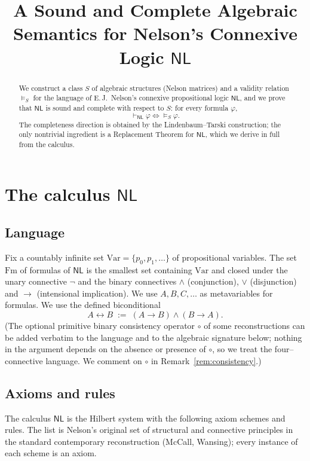 \documentclass[12pt]{article}
\theoremstyle{definition}
\newcommand{\NL}{\mathsf{NL}}
\newcommand{\prv}{\vdash_{\NL}}
\newcommand{\vld}{\vDash}
\newcommand{\Fm}{\mathrm{Fm}}
\newcommand{\Var}{\mathrm{Var}}
\newcommand{\imp}{\rightarrow}
\newcommand{\bic}{\leftrightarrow}
\begin{document}
\title{A Sound and Complete Algebraic Semantics for Nelson's Connexive Logic $\NL$}
\author{}
\date{}
\maketitle

\begin{abstract}
We construct a class $S$ of algebraic structures (Nelson matrices) and a
validity relation $\vld_{S}$ for the language of E.\,J.~Nelson's connexive
propositional logic $\NL$, and we prove that $\NL$ is sound and complete with
respect to $S$: for every formula $\varphi$,
\[
\prv \varphi \iff \vld_{S}\varphi .
\]
The completeness direction is obtained by the Lindenbaum--Tarski construction;
the only nontrivial ingredient is a Replacement Theorem for $\NL$, which we
derive in full from the calculus.
\end{abstract}

\section{The calculus $\NL$}

\subsection{Language}

Fix a countably infinite set $\Var=\{p_{0},p_{1},\dots\}$ of propositional
variables. The set $\Fm$ of formulas of $\NL$ is the smallest set containing
$\Var$ and closed under the unary connective $\neg$ and the binary connectives
$\wedge$ (conjunction), $\vee$ (disjunction) and $\imp$ (intensional
implication). We use $A,B,C,\dots$ as metavariables for formulas. We use the
defined biconditional
\[
A\bic B \;:=\; (A\imp B)\wedge(B\imp A).
\]
(The optional primitive binary consistency operator $\circ$ of some
reconstructions can be added verbatim to the language and to the algebraic
signature below; nothing in the argument depends on the absence or presence of
$\circ$, so we treat the four--connective language. We comment on $\circ$ in
Remark~\ref{rem:consistency}.)

\subsection{Axioms and rules}\label{ss:calculus}

The calculus $\NL$ is the Hilbert system with the following axiom schemes and
rules. The list is Nelson's original set of structural and connective principles
in the standard contemporary reconstruction (McCall, Wansing); every instance of
each scheme is an axiom.
\end{document}
